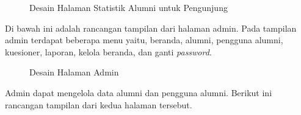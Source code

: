 \begin{figure}[H]
	\centering
	\caption{Desain Halaman Statistik Alumni untuk Pengunjung}
	\label{pengunjung_statistik}
\end{figure}

Di bawah ini adalah rancangan tampilan dari halaman admin. Pada tampilan admin terdapat beberapa menu yaitu, beranda, alumni, pengguna alumni, kuesioner, laporan, kelola beranda, dan ganti \textit{password}. 

\begin{figure}[H]
	\centering
	\caption{Desain Halaman Admin}
	\label{admin_beranda}
\end{figure}

Admin dapat mengelola data alumni dan pengguna alumni. Berikut ini rancangan tampilan dari kedua halaman tersebut. 

